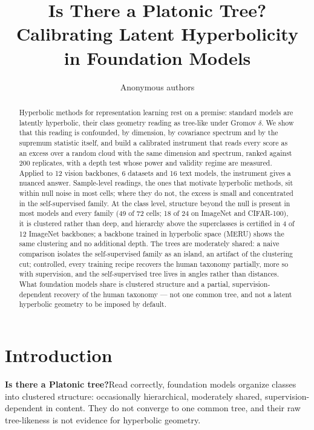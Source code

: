 \documentclass{article}
\title{Is There a Platonic Tree? \\ Calibrating Latent Hyperbolicity \\ in Foundation Models}
\author{Anonymous authors}
\begin{document}
\maketitle

\begin{abstract}
Hyperbolic methods for representation learning rest on a premise: standard models are latently hyperbolic, their class geometry reading as tree-like under Gromov $\delta$. We show that this reading is confounded, by dimension, by covariance spectrum and by the supremum statistic itself, and build a calibrated instrument that reads every score as an excess over a random cloud with the same dimension and spectrum, ranked against 200 replicates, with a depth test whose power and validity regime are measured. Applied to 12 vision backbones, 6 datasets and 16 text models, the instrument gives a nuanced answer. Sample-level readings, the ones that motivate hyperbolic methods, sit within null noise in most cells; where they do not, the excess is small and concentrated in the self-supervised family. At the class level, structure beyond the null is present in most models and every family (49 of 72 cells; 18 of 24 on ImageNet and CIFAR-100), it is clustered rather than deep, and hierarchy above the superclasses is certified in 4 of 12 ImageNet backbones; a backbone trained in hyperbolic space (MERU) shows the same clustering and no additional depth. The trees are moderately shared: a naive comparison isolates the self-supervised family as an island, an artifact of the clustering cut; controlled, every training recipe recovers the human taxonomy partially, more so with supervision, and the self-supervised tree lives in angles rather than distances. What foundation models share is clustered structure and a partial, supervision-dependent recovery of the human taxonomy --- not one common tree, and not a latent hyperbolic geometry to be imposed by default. %
\end{abstract}

\section{Introduction}
\label{sec:introduction}

\begin{tcolorbox}[colback=gray!6, colframe=black!55, boxrule=0.5pt, arc=1.5pt, left=6pt, right=6pt, top=4pt, bottom=4pt]
\textbf{Is there a Platonic tree?}\quad Read correctly, foundation models organize classes into clustered structure: occasionally hierarchical, moderately shared, supervision-dependent in content. They do not converge to one common tree, and their raw tree-likeness is not evidence for hyperbolic geometry.
\end{tcolorbox}
\end{document}
